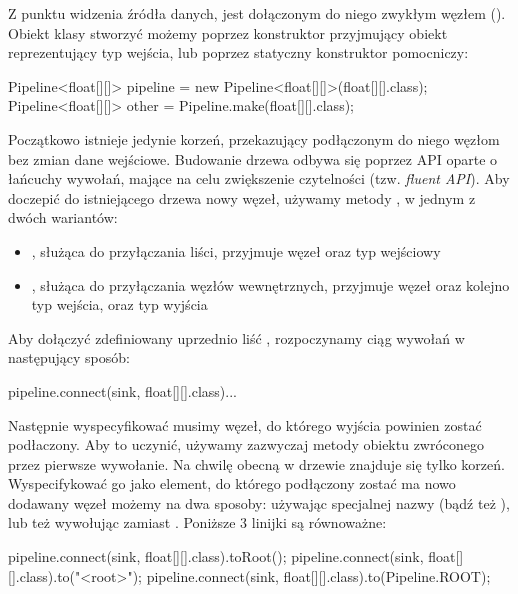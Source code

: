Z punktu widzenia źródła danych,  jest dołączonym do niego zwykłym węzłem
().  Obiekt klasy  stworzyć możemy poprzez konstruktor przyjmujący
obiekt  reprezentujący typ wejścia, lub poprzez statyczny konstruktor pomocniczy:

\begin{java}
Pipeline<float[][]> pipeline = new Pipeline<float[][]>(float[][].class);
Pipeline<float[][]> other = Pipeline.make(float[][].class);
\end{java}

Początkowo istnieje jedynie korzeń, przekazujący podłączonym do niego węzłom bez zmian dane
wejściowe. Budowanie drzewa odbywa się poprzez API oparte o łańcuchy wywołań, mające na celu
zwiększenie czytelności (tzw. \emph{fluent API}). Aby doczepić do istniejącego drzewa nowy węzeł,
używamy metody , w jednym z dwóch wariantów:

\begin{itemize}

  \item {}, służąca do przyłączania liści, przyjmuje
    węzeł oraz typ wejściowy

  \item {}, służąca do
    przyłączania węzłów wewnętrznych, przyjmuje węzeł oraz kolejno typ wejścia, oraz typ wyjścia

\end{itemize}

Aby dołączyć zdefiniowany uprzednio liść , rozpoczynamy ciąg wywołań w następujący
sposób:

\begin{java}
pipeline.connect(sink, float[][].class)...
\end{java}

Następnie wyspecyfikować musimy węzeł, do którego wyjścia powinien zostać podłaczony. Aby to
uczynić, używamy zazwyczaj metody  obiektu zwróconego przez pierwsze wywołanie. Na chwilę
obecną w drzewie znajduje się tylko korzeń. Wyspecifykować go jako element, do którego podłączony
zostać ma nowo dodawany węzeł możemy na dwa sposoby: używając specjalnej nazwy  (bądź
też ), lub też wywołując  zamiast . Poniższe 3 linijki są
równoważne:

\begin{java}
pipeline.connect(sink, float[][].class).toRoot();
pipeline.connect(sink, float[][].class).to("<root>");
pipeline.connect(sink, float[][].class).to(Pipeline.ROOT);
\end{java}

